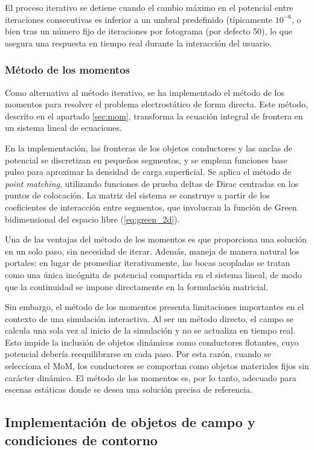 \documentclass[12pt, twocolumn]{article}
\begin{document}
El proceso iterativo se detiene cuando el cambio máximo en el potencial entre iteraciones consecutivas es inferior a un umbral predefinido (típicamente $10^{-6}$, o bien tras un número fijo de iteraciones por fotograma (por defecto 50), lo que asegura una respuesta en tiempo real durante la interacción del usuario.

\subsubsection{Método de los momentos}

Como alternativa al método iterativo, se ha implementado el método de los momentos para resolver el problema electrostático de forma directa. Este método, descrito en el apartado \ref{sec:mom}, transforma la ecuación integral de frontera en un sistema lineal de ecuaciones.

En la implementación, las fronteras de los objetos conductores y las anclas de potencial se discretizan en pequeños segmentos, y se emplean funciones base pulso para aproximar la densidad de carga superficial. Se aplica el método de \textit{point matching}, utilizando funciones de prueba deltas de Dirac centradas en los puntos de colocación. La matriz del sistema se construye a partir de los coeficientes de interacción entre segmentos, que involucran la función de Green bidimensional del espacio libre (\ref{eq:green_2d}).

Una de las ventajas del método de los momentos es que proporciona una solución en un solo paso, sin necesidad de iterar. Además, maneja de manera natural los portales: en lugar de promediar iterativamente, las bocas acopladas se tratan como una única incógnita de potencial compartida en el sistema lineal, de modo que la continuidad se impone directamente en la formulación matricial.

Sin embargo, el método de los momentos presenta limitaciones importantes en el contexto de una simulación interactiva. Al ser un método directo, el campo se calcula una sola vez al inicio de la simulación y no se actualiza en tiempo real. Esto impide la inclusión de objetos dinámicos como conductores flotantes, cuyo potencial debería reequilibrarse en cada paso. Por esta razón, cuando se selecciona el MoM, los conductores se comportan como objetos materiales fijos sin carácter dinámico. El método de los momentos es, por lo tanto, adecuado para escenas estáticas donde se desea una solución precisa de referencia.

\subsection{Implementación de objetos de campo y condiciones de contorno}
\end{document}
